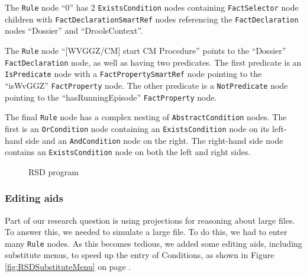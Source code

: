 The \texttt{Rule} node ``0'' has 2 \texttt{ExistsCondition} nodes containing \texttt{FactSelector} node children with \linebreak\texttt{FactDeclarationSmartRef} nodes referencing the \texttt{FactDeclaration} nodes ``Dossier'' and ``DroolsContext''.

The \texttt{Rule} node ``[WVGGZ/CM] start CM Procedure'' points to the ``Dossier'' \texttt{FactDeclaration} node, as well as having two predicates.
The first predicate is an \texttt{IsPredicate} node with a \texttt{FactPropertySmartRef} node pointing to the ``isWvGGZ'' \texttt{FactProperty} node.
The other predicate is a \texttt{NotPredicate} node pointing to the ``hasRunningEpisode'' \texttt{FactProperty} node.

The final \texttt{Rule} node has a complex nesting of \texttt{AbstractCondition} nodes.
The first is an \texttt{OrCondition} node containing an \texttt{ExistsCondition} node on its left-hand side and an \texttt{AndCondition} node on the right.
The right-hand side node contains an \texttt{ExistsCondition} node on both the left and right sides. 

\begin{figure}[h]
    \centering
    \caption{RSD program}
    \label{fig:RSDProgram}
\end{figure}

\newpage
\subsubsection{Editing aids}
Part of our research question is using projections for reasoning about large files.
To answer this, we needed to simulate a large file.
To do this, we had to enter many \texttt{Rule} nodes.
As this becomes tedious, we added some editing aids, including substitute menus, to speed up the entry of Conditions, as shown in Figure \ref{fig:RSDSubstituteMenu} on page \pageref{fig:RSDSubstituteMenu}.

